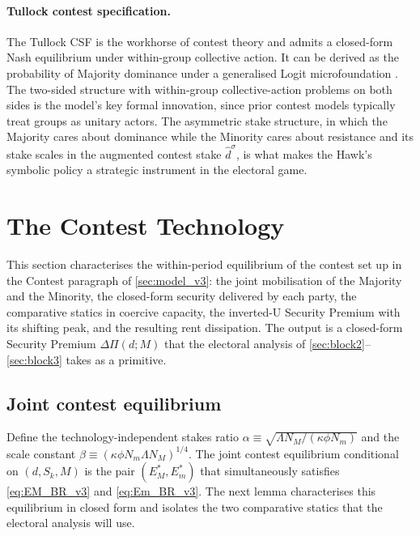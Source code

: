 \documentclass[11pt,twoside]{extarticle}
\begin{document}
\paragraph{Tullock contest specification.} The Tullock CSF \citep*{skaperdasContestSuccessFunctions1996} is the workhorse of contest theory and admits a closed-form Nash equilibrium under within-group collective action. It can be derived as the probability of Majority dominance under a generalised Logit microfoundation \citep*{jiaStochasticDerivationRatio2008}. The two-sided structure with within-group collective-action problems on both sides is the model's key formal innovation, since prior contest models typically treat groups as unitary actors. The asymmetric stake structure, in which the Majority cares about dominance while the Minority cares about resistance and its stake scales in the augmented contest stake $\hat d^\sigma$, is what makes the Hawk's symbolic policy a strategic instrument in the electoral game.

\section{The Contest Technology}\label{sec:block1}

This section characterises the within-period equilibrium of the contest set up in the Contest paragraph of \autoref{sec:model_v3}: the joint mobilisation of the Majority and the Minority, the closed-form security delivered by each party, the comparative statics in coercive capacity, the inverted-U Security Premium with its shifting peak, and the resulting rent dissipation. The output is a closed-form Security Premium $\Delta\Pi(d;M)$ that the electoral analysis of \autoref{sec:block2}--\autoref{sec:block3} takes as a primitive.

\subsection{Joint contest equilibrium}\label{subsec:contest_eqm_v3}

Define the technology-independent stakes ratio $\alpha\equiv\sqrt{\Lambda N_M/(\kappa\phi N_m)}$ and the scale constant $\beta\equiv(\kappa\phi N_m\Lambda N_M)^{1/4}$. The joint contest equilibrium conditional on $(d,S_k,M)$ is the pair $(E_M^*,E_m^*)$ that simultaneously satisfies \autoref{eq:EM_BR_v3} and \autoref{eq:Em_BR_v3}. The next lemma characterises this equilibrium in closed form and isolates the two comparative statics that the electoral analysis will use.
\end{document}
